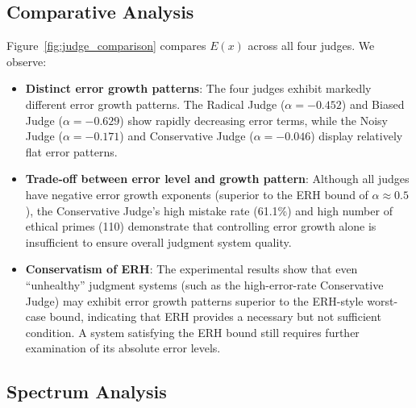 \documentclass[12pt,a4paper]{article}
\theoremstyle{definition}
\theoremstyle{remark}
\begin{document}
\subsection{Comparative Analysis}

Figure~\ref{fig:judge_comparison} compares $E(x)$ across all four judges. We observe:
\begin{itemize}
    \item \textbf{Distinct error growth patterns}: The four judges exhibit markedly different error growth patterns. The Radical Judge ($\alpha = -0.452$) and Biased Judge ($\alpha = -0.629$) show rapidly decreasing error terms, while the Noisy Judge ($\alpha = -0.171$) and Conservative Judge ($\alpha = -0.046$) display relatively flat error patterns.
    \item \textbf{Trade-off between error level and growth pattern}: Although all judges have negative error growth exponents (superior to the ERH bound of $\alpha \approx 0.5$), the Conservative Judge's high mistake rate (61.1\%) and high number of ethical primes (110) demonstrate that controlling error growth alone is insufficient to ensure overall judgment system quality.
    \item \textbf{Conservatism of ERH}: The experimental results show that even ``unhealthy'' judgment systems (such as the high-error-rate Conservative Judge) may exhibit error growth patterns superior to the ERH-style worst-case bound, indicating that ERH provides a necessary but not sufficient condition. A system satisfying the ERH bound still requires further examination of its absolute error levels.
\end{itemize}

\subsection{Spectrum Analysis}
\end{document}

